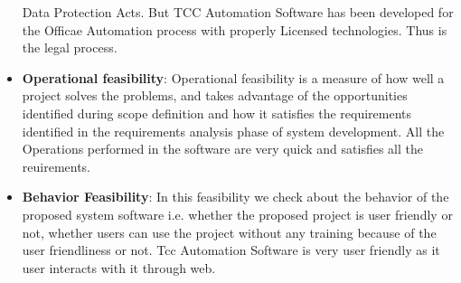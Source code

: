 \begin{itemize}
Data Protection Acts. But TCC Automation Software has been developed 
for the Officae Automation process with properly Licensed technologies. 
Thus is the legal process.
\item {\bf{Operational feasibility}}: Operational feasibility is a measure 
of how well a project solves the problems, and takes advantage of the 
opportunities identified during scope definition and how it satisfies 
the requirements identified in the requirements analysis phase of system 
development. All the Operations performed in the software are very quick 
and satisfies all the reuirements.
\item {\bf{Behavior Feasibility}}: In this feasibility we check about the 
behavior of the proposed system software i.e. whether the proposed 
project is user friendly or not, whether users can use the project 
without any training because of the user friendliness or not. Tcc 
Automation Software is very user friendly as it user interacts with it 
through web.
\end{itemize}

